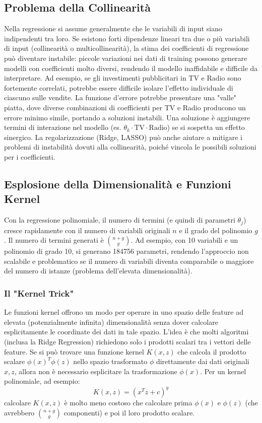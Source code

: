 \documentclass{article}
\begin{document}
\subsection{Problema della Collinearità}
Nella regressione si assume generalmente che le variabili di input siano indipendenti tra loro. Se esistono forti dipendenze lineari tra due o più variabili di input (collinearità o multicollinearità), la stima dei coefficienti di regressione può diventare instabile: piccole variazioni nei dati di training possono generare modelli con coefficienti molto diversi, rendendo il modello inaffidabile e difficile da interpretare.
Ad esempio, se gli investimenti pubblicitari in TV e Radio sono fortemente correlati, potrebbe essere difficile isolare l'effetto individuale di ciascuno sulle vendite. La funzione d'errore potrebbe presentare una "valle" piatta, dove diverse combinazioni di coefficienti per TV e Radio producono un errore minimo simile, portando a soluzioni instabili.
Una soluzione è aggiungere termini di interazione nel modello (es. $\theta_k \cdot \text{TV} \cdot \text{Radio}$) se si sospetta un effetto sinergico. La regolarizzazione (Ridge, LASSO) può anche aiutare a mitigare i problemi di instabilità dovuti alla collinearità, poiché vincola le possibili soluzioni per i coefficienti.

\subsection{Esplosione della Dimensionalità e Funzioni Kernel}
Con la regressione polinomiale, il numero di termini (e quindi di parametri $\theta_j$) cresce rapidamente con il numero di variabili originali $n$ e il grado del polinomio $g$. Il numero di termini generati è $\binom{n+g}{g}$. Ad esempio, con 10 variabili e un polinomio di grado 10, si generano 184756 parametri, rendendo l'approccio non scalabile e problematico se il numero di variabili diventa comparabile o maggiore del numero di istanze (problema dell'elevata dimensionalità).

\subsubsection{Il "Kernel Trick"}
Le funzioni kernel offrono un modo per operare in uno spazio delle feature ad elevata (potenzialmente infinita) dimensionalità senza dover calcolare esplicitamente le coordinate dei dati in tale spazio. L'idea è che molti algoritmi (inclusa la Ridge Regression) richiedono solo i prodotti scalari tra i vettori delle feature. Se si può trovare una funzione kernel $K(x, z)$ che calcola il prodotto scalare $\phi(x)^T \phi(z)$ nello spazio trasformato $\phi$ direttamente dai dati originali $x, z$, allora non è necessario esplicitare la trasformazione $\phi(x)$.
Per un kernel polinomiale, ad esempio:
$$ K(x, z) = (x^T z + c)^g $$
calcolare $K(x,z)$ è molto meno costoso che calcolare prima $\phi(x)$ e $\phi(z)$ (che avrebbero $\binom{n+g}{g}$ componenti) e poi il loro prodotto scalare.
\end{document}
